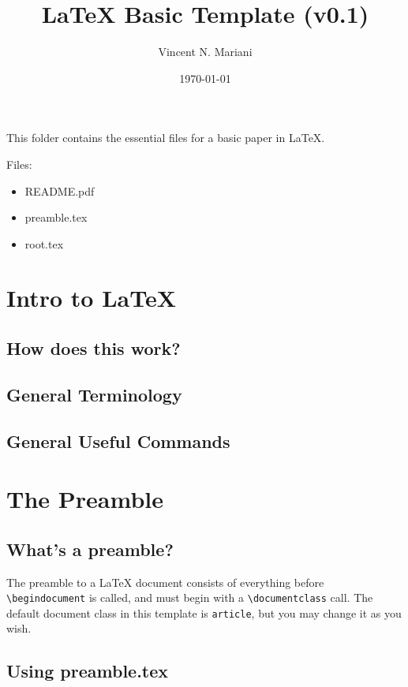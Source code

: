 \documentclass{article}
\author{Vincent N. Mariani}
\date{\today}
\title{LaTeX Basic Template (v0.1)}
\begin{document}
    \maketitle%

This folder contains the essential files for a basic paper in \LaTeX. 

Files:\\
\begin{itemize}
    \item README.pdf
    \item preamble.tex
    \item root.tex
\end{itemize}

\tableofcontents

\section{Intro to \LaTeX}

\subsection{How does this work?}

\subsection{General Terminology}

\subsection{General Useful Commands}

\section{The Preamble}



\subsection{What's a preamble?}

The preamble to a LaTeX document consists of everything before \texttt{\textbackslash begin{document}} is called, and must begin with a \texttt{\textbackslash documentclass{}} call. The default document class in this template is \texttt{article}, but you may change it as you wish.

\subsection{Using preamble.tex}
\end{document}

